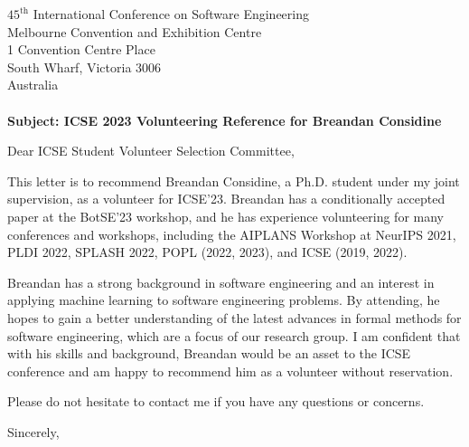 \documentclass{letter}
\begin{document}
\begin{letter}{$45^{\text{th}}$ International Conference on Software Engineering\\Melbourne Convention and Exhibition Centre\\1 Convention Centre Place\\South Wharf, Victoria 3006\\Australia\\
\vspace{30pt}\\
\textbf{Subject: ICSE 2023 Volunteering Reference for Breandan Considine}}
  \opening{Dear ICSE Student Volunteer Selection Committee,}
  This letter is to recommend Breandan Considine, a Ph.D. student under my joint supervision, as a volunteer for ICSE'23. Breandan has a conditionally accepted paper at the BotSE'23 workshop, and he has experience volunteering for many conferences and workshops, including the AIPLANS Workshop at NeurIPS 2021, PLDI 2022, SPLASH 2022, POPL (2022, 2023), and ICSE (2019, 2022).

  Breandan has a strong background in software engineering and an interest in applying machine learning to software engineering problems. By attending, he hopes to gain a better understanding of the latest advances in formal methods for software engineering, which are a focus of our research group. I am confident that with his skills and background, Breandan would be an asset to the ICSE conference and am happy to recommend him as a volunteer without reservation.

  Please do not hesitate to contact me if you have any questions or concerns.
  \vspace{10pt}

  \closing{Sincerely,\\
  \vspace{30pt}
  }
\end{letter}
\end{document}
